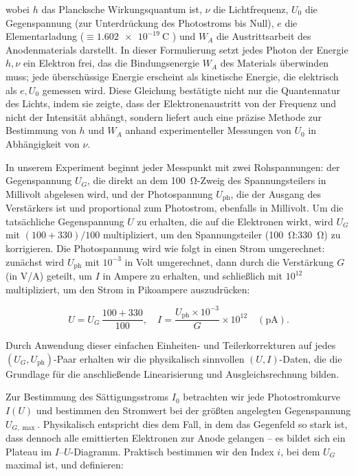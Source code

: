 wobei $h$ das Plancksche Wirkungsquantum ist, $\nu$ die Lichtfrequenz, $U_{0}$ die Gegenspannung (zur Unterdrückung des Photostroms bis Null), $e$ die Elementarladung ($\equiv \SI{1.602e-19}{\coulomb}$ \cite{codata}) und $W_{A}$ die Austrittsarbeit des Anodenmaterials darstellt. In dieser Formulierung setzt jedes Photon der Energie $h,\nu$ ein Elektron frei, das die Bindungsenergie $W_{A}$ des Materials überwinden muss; jede überschüssige Energie erscheint als kinetische Energie, die elektrisch als $e,U_{0}$ gemessen wird. Diese Gleichung bestätigte nicht nur die Quanten­natur des Lichts, indem sie zeigte, dass der Elektronenaustritt von der Frequenz und nicht der Intensität abhängt, sondern liefert auch eine präzise Methode zur Bestimmung von $h$ und $W_{A}$ anhand experimenteller Messungen von $U_{0}$ in Abhängigkeit von $\nu$.

In unserem Experiment beginnt jeder Messpunkt mit zwei Rohspannungen: der Gegenspannung $U_{G}$, die direkt an dem \SI{100}{\ohm}-Zweig des Spannungsteilers in Millivolt abgelesen wird, und der Photospannung $U_{\mathrm{ph}}$, die der Ausgang des Verstärkers ist und proportional zum Photostrom, ebenfalls in Millivolt. Um die tatsächliche Gegenspannung $U$ zu erhalten, die auf die Elektronen wirkt, wird $U_{G}$ mit $(100+330)/100$ multipliziert, um den Spannungsteiler (\SI{100}{\ohm}:\SI{330}{\ohm}) zu korrigieren. Die Photospannung wird wie folgt in einen Strom umgerechnet: zunächst wird $U_{\mathrm{ph}}$ mit $10^{-3}$ in Volt umgerechnet, dann durch die Verstärkung $G$ (in V/A) geteilt, um $I$ in Ampere zu erhalten, und schließlich mit $10^{12}$ multipliziert, um den Strom in Pikoampere auszudrücken:

\begin{equation}
  U = U_{G}\,\frac{100 + 330}{100},\quad
  I = \frac{U_{\mathrm{ph}}\times10^{-3}}{G}\times10^{12}
  \quad(\mathrm{pA}).
\end{equation}

Durch Anwendung dieser einfachen Einheiten- und Teilerkorrekturen auf jedes $(U_{G},U_{\mathrm{ph}})$-Paar erhalten wir die physikalisch sinnvollen $(U,I)$-Daten, die die Grundlage für die anschließende Linearisierung und Ausgleichsrechnung bilden.

Zur Bestimmung des Sättigungsstroms $I_{0}$ betrachten wir jede Photostromkurve $I(U)$ und bestimmen den Stromwert bei der größten angelegten Gegenspannung $U_{G,\max}$. Physikalisch entspricht dies dem Fall, in dem das Gegenfeld so stark ist, dass dennoch alle emittierten Elektronen zur Anode gelangen – es bildet sich ein Plateau im $I$–$U$-Diagramm. Praktisch bestimmen wir den Index $i$, bei dem $U_{G}$ maximal ist, und definieren:

